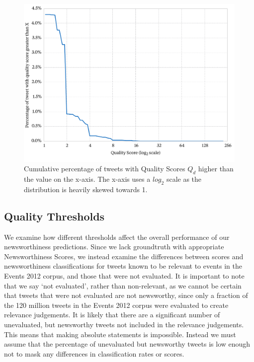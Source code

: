 \begin{figure}[h!]
	\centering
	\includegraphics[width=\textwidth]{Chapters/Newsworthiness/data/positivescores.pdf}
	\caption[Cumulative percentage of tweets with Quality Scores \(Q_d\) higher than the value on the x-axis]{Cumulative percentage of tweets with Quality Scores \(Q_d\) higher than the value on the x-axis. The x-axis uses a \(log_2\) scale as the distribution is heavily skewed towards 1.}
	\label{scoring:graphic:highQualityScores}
\end{figure}

\subsection{Quality Thresholds}
We examine how different thresholds affect the overall performance of our newsworthiness predictions.
Since we lack groundtruth with appropriate Newsworthiness Scores, we instead examine the differences between scores and newsworthiness classifications for tweets known to be relevant to events in the Events 2012 corpus, and those that were not evaluated.
It is important to note that we say `not evaluated', rather than non-relevant, as  we cannot be certain that tweets that were not evaluated are not newsworthy, since only a fraction of the 120 million tweets in the Events 2012 corpus were evaluated to create relevance judgements.
It is likely that there are a significant number of unevaluated, but newsworthy tweets not included in the relevance judgements.
This means that making absolute statements is impossible.
Instead we must assume that the percentage of unevaluated but newsworthy tweets is low enough not to mask any differences in classification rates or scores.

